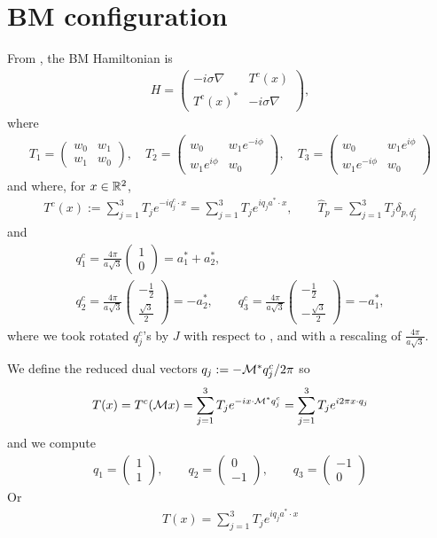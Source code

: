 \documentclass[11pt,a4paper,reqno,french,tikz]{amsart}
\newcommand{\na}{\nabla} %
\newcommand{\f}[2]{\frac{#1}{#2}} %
\newcommand{\mat}[1]{\begin{pmatrix} #1 \end{pmatrix}} %
\begin{document}
\section{BM configuration}%
\label{sec:bm_configuration}


From \cite{BecEmbWitZwo21}, the BM Hamiltonian is
\begin{align*}
	H = \mat{-i\sigma \na & T^c(x) \\ T^c(x)^* & -i \sigma \na},
\end{align*}
where
\begin{align*}
\boxed{T_1 = \mat{w_0 & w_1 \\ w_1 & w_0}, \quad  T_2 = \mat{w_0 &  w_1e^{-i\phi} \\  w_1e^{i\phi} & w_0}, \quad T_3 = \mat{w_0 &  w_1e^{i\phi} \\  w_1e^{-i\phi} & w_0}}
\end{align*}
and where, for $x \in \mathbb{R}^2$,
\begin{align*}
T^c(x) := \sum_{j=1}^3 T_j e^{-iq^c_j \cdot x} = \sum_{j=1}^3 T_j e^{iq_j a^*\cdot x}, \qquad \widehat{T}_p = \sum_{j=1}^{3} T_j \delta_{p,q_j^c}
\end{align*}
and
\begin{multline*}
q^c_1 = \f{4\pi}{a\sqrt{3}} \mat{1 \\ 0} = a_1^* + a_2^*, \\
q^c_2 = \f{4\pi}{a\sqrt{3}} \mat{-\f 12 \\ \f{\sqrt{3}}{2}} = -a_2^*, \qquad q^c_3 = \f{4\pi}{a\sqrt{3}} \mat{-\f 12 \\ -\f{\sqrt{3}}{2}} = -a_1^*,
\end{multline*}
where we took rotated $q_j^c$'s by $J$ with respect to \cite{BecEmbWitZwo21}, and with a rescaling of $\f{4\pi}{a\sqrt{3}}$.

We define the reduced dual vectors $q_j := -\mathcal{M}^* q^c_j /2\pi$ so
\begin{align*}
T(x) = T^c(\mathcal{M} x) = \sum_{j=1}^3 T_j e^{-ix\cdot \mathcal{M}^* q_j^c}= \sum_{j=1}^3 T_j e^{i2\pi x\cdot q_j}
\end{align*}
and we compute
\begin{align*}
\boxed{q_1 = \mat{1 \\ 1}, \qquad q_{2} = \mat{0 \\ -1}, \qquad q_{3} = \mat{-1 \\ 0}}
\end{align*}
Or
\begin{align*}
\boxed{T(x) = \sum_{j=1}^3 T_j e^{i q_j a^* \cdot x}}
\end{align*}
\end{document}
